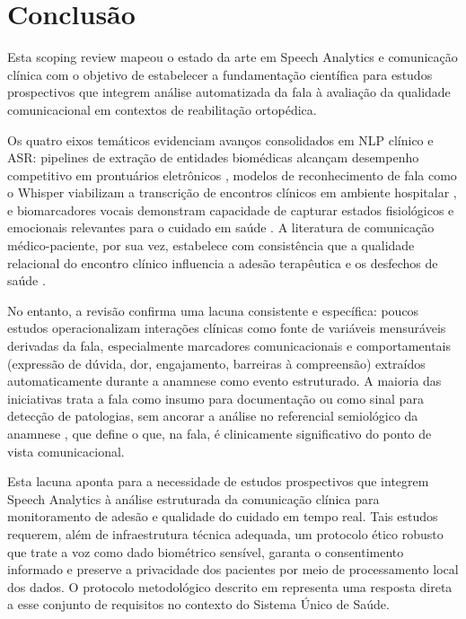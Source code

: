 \documentclass[a4paper,fleqn]{cas-sc}
\begin{document}
\section{Conclusão}
\label{sec:conclusao}

Esta scoping review mapeou o estado da arte em Speech Analytics e
comunicação clínica com o objetivo de estabelecer a fundamentação
científica para estudos prospectivos que integrem análise automatizada
da fala à avaliação da qualidade comunicacional em contextos de
reabilitação ortopédica.

Os quatro eixos temáticos evidenciam avanços consolidados em NLP clínico
e ASR: pipelines de extração de entidades biomédicas alcançam desempenho
competitivo em prontuários eletrônicos \citep{Bazoge2023,Koleck2019},
modelos de reconhecimento de fala como o Whisper \citep{Radford2023}
viabilizam a transcrição de encontros clínicos em ambiente hospitalar
\citep{Klusty2025,Ng2025}, e biomarcadores vocais demonstram capacidade
de capturar estados fisiológicos e emocionais relevantes para o cuidado
em saúde \citep{Fagherazzi2021,Albert2024}.
A literatura de comunicação médico-paciente, por sua vez, estabelece
com consistência que a qualidade relacional do encontro clínico influencia
a adesão terapêutica e os desfechos de saúde \citep{Kelley2014,Rucinski2022}.

No entanto, a revisão confirma uma lacuna consistente e específica:
poucos estudos operacionalizam interações clínicas como fonte de
variáveis mensuráveis derivadas da fala, especialmente marcadores
comunicacionais e comportamentais (expressão de dúvida, dor, engajamento,
barreiras à compreensão) extraídos automaticamente durante a anamnese
como evento estruturado.
A maioria das iniciativas trata a fala como insumo para documentação ou
como sinal para detecção de patologias, sem ancorar a análise no
referencial semiológico da anamnese \citep{Porto2019}, que define
o que, na fala, é clinicamente significativo do ponto de vista
comunicacional.

Esta lacuna aponta para a necessidade de estudos prospectivos que integrem
Speech Analytics à análise estruturada da comunicação clínica para
monitoramento de adesão e qualidade do cuidado em tempo real.
Tais estudos requerem, além de infraestrutura técnica adequada, um
protocolo ético robusto que trate a voz como dado biométrico sensível,
garanta o consentimento informado e preserve a privacidade dos pacientes
por meio de processamento local dos dados.
O protocolo metodológico descrito em \citet{BaenaNeto2026} representa uma resposta direta a esse
conjunto de requisitos no contexto do Sistema Único de Saúde.
\end{document}
